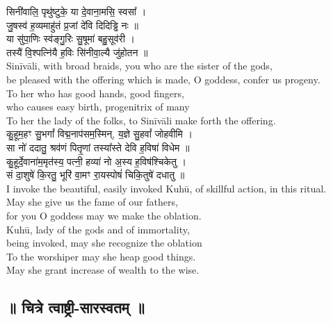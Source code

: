 \documentclass[11pt]{article}
\begin{document}
\begin{adjustwidth}{6em}{.2em}
{\large\skts\color{deepblue}
सिनी॑वालि॒ पृथु॑ष्टुके॒ या दे॒वाना॒मसि॒ स्वसा᳚ ।\\
जु॒षस्व॑ ह॒व्यमाहु॑तं प्र॒जां दे॑वि दिदिड्ढि नः ॥\\
या सु॑पा॒णिः स्व॑ङ्गु॒रिः सु॒षूमा॑ बहु॒सूव॑री ।\\
तस्यै॑ वि॒श्पत्नि॑यै ह॒विः सि॑नीवा॒ल्यै जु॑होतन ॥}\\[5pt]
Sinīvāli, with broad braids, you who are the sister of the gods,\\
be pleased with the offering which is made, O goddess, confer us progeny.\\
To her who has good hands, good fingers,\\ 
who causes easy birth, progenitrix of many\\
To her the lady of the folks, to Sinīvāli make forth the offering.\\[10pt]

{\large\skts\color{deepblue}
कु॒हूम॒हꣳ सु॒भगां᳚ विद्म॒नाप॑सम॒स्मिन्, य॒ज्ञे सु॒हवां᳚ जोहवीमि ।\\
सा नो॑ ददातु॒ श्रव॑णं पितृ॒णां तस्या᳚स्ते देवि ह॒विषा॑ विधेम ॥\\
कु॒हूर्दे॒वाना॑म॒मृत॑स्य॒ पत्नी॒ हव्या॑ नो अ॒स्य ह॒विष॑श्चिकेतु ।\\
सं दा॒शुषे॑ कि॒रतु॒ भूरि॑ वा॒मꣳ रा॒यस्पोषं॑ चिकि॒तुषे॑ दधातु ॥}\\[5pt]
I invoke the beautiful, easily invoked Kuhū, of skillful action, in this ritual.\\
May she give us the fame of our fathers,\\
for you O goddess may we make the oblation.\\
Kuhū, lady of the gods and of immortality,\\
being invoked, may she recognize the oblation\\
To the worshiper may she heap good things.\\
May she grant increase of wealth to the wise.\\
\end{adjustwidth}
\newpage
\begin{center}
	\section{{\Large\skts ॥ चित्रे त्वाष्ट्री-सारस्वतम् ॥}}
\end{center}
\end{document}
